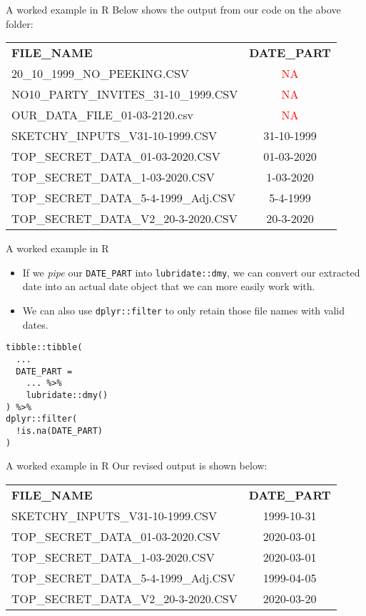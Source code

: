 \documentclass[
	usenames,
	dvipsnames,
	handout
] {beamer}
\begin{document}
\begin{frame}{A worked example in R}
	Below shows the output from our code on the above folder: \\
	\medskip
	\begin{center}
		\begin{tabular}{l c}
			\textbf{FILE\_NAME} & \textbf{DATE\_PART} \\	
			20\_10\_1999\_NO\_PEEKING.CSV & \textcolor{red}{NA} \\
			NO10\_PARTY\_INVITES\_31-10\_1999.CSV & \textcolor{red}{NA} \\
			OUR\_DATA\_FILE\_01-03-2120.csv & \textcolor{red}{NA} \\
			SKETCHY\_INPUTS\_V31-10-1999.CSV & 31-10-1999 \\
			TOP\_SECRET\_DATA\_01-03-2020.CSV & 01-03-2020 \\
			TOP\_SECRET\_DATA\_1-03-2020.CSV & 1-03-2020 \\
			TOP\_SECRET\_DATA\_5-4-1999\_Adj.CSV & 5-4-1999 \\
			TOP\_SECRET\_DATA\_V2\_20-3-2020.CSV & 20-3-2020
		\end{tabular}
	\end{center}
\end{frame}

\begin{frame}[fragile]{A worked example in R}
	\begin{itemize}[label=\textbullet]
		\item If we \emph{pipe} our \texttt{DATE\_PART} into \texttt{lubridate::dmy}, we can convert our extracted date into an actual date object that we can more easily work with.
			\pause
		\item We can also use \texttt{dplyr::filter} to only retain those file names with valid dates.
			\pause
	\end{itemize}

	\medskip
		
	\begin{lstlisting}
tibble::tibble(
  ...
  DATE_PART =
    ... %>%
    lubridate::dmy()    
) %>%
dplyr::filter(
  !is.na(DATE_PART)
)
	\end{lstlisting}
\end{frame}

\begin{frame}{A worked example in R}
	Our revised output is shown below: \\
	\medskip
	\begin{center}
		\begin{tabular}{l c}
			\textbf{FILE\_NAME} & \textbf{DATE\_PART} \\	
			SKETCHY\_INPUTS\_V31-10-1999.CSV & 1999-10-31 \\
			TOP\_SECRET\_DATA\_01-03-2020.CSV & 2020-03-01 \\
			TOP\_SECRET\_DATA\_1-03-2020.CSV & 2020-03-01 \\
			TOP\_SECRET\_DATA\_5-4-1999\_Adj.CSV & 1999-04-05 \\
			TOP\_SECRET\_DATA\_V2\_20-3-2020.CSV & 2020-03-20
		\end{tabular}
	\end{center}
\end{frame}
\end{document}
